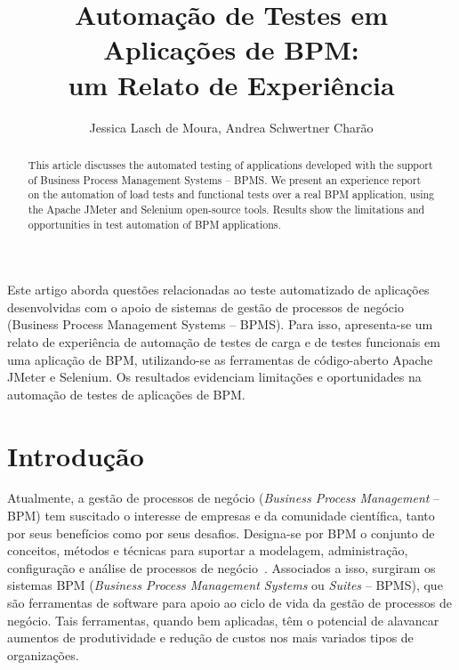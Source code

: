 \documentclass[12pt]{article}
\title{Automação de Testes em Aplicações de BPM:\\ um Relato de Experiência}
\author{Jessica Lasch de Moura\inst{1},
Andrea Schwertner Charão\inst{1}}
\begin{document}
\maketitle




\begin{resumo}
Este artigo aborda questões relacionadas ao teste automatizado de aplicações desenvolvidas com o apoio de sistemas de gestão de processos de negócio (Business Process Management Systems -- BPMS). Para isso, apresenta-se um relato de experiência de automação de testes de carga e de testes funcionais em uma aplicação de BPM, utilizando-se as ferramentas de código-aberto Apache JMeter e Selenium. Os resultados evidenciam limitações e oportunidades na automação de testes de aplicações de BPM.
\end{resumo}

\begin{abstract}
This article discusses the automated testing of applications developed with the support of Business Process Management Systems -- BPMS. We present an experience report on the automation of load tests and functional tests over a real BPM application, using the Apache JMeter and Selenium open-source tools. Results show the limitations and opportunities in test automation of BPM applications.
\end{abstract}




\section{Introdução}

Atualmente, a gestão de processos de negócio (\emph{Business Process Management} -- BPM) tem suscitado o interesse de empresas e da comunidade científica, tanto por seus benefícios como por seus desafios. Designa-se por BPM o conjunto de conceitos, métodos e técnicas para suportar a modelagem, administração, configuração e análise de processos de negócio~\cite{weske, aalst2013survey}. Associados a isso, surgiram os sistemas BPM (\emph{Business Process Management Systems} ou \emph{Suites} -- BPMS), que são ferramentas de software para apoio ao ciclo de vida da gestão de processos de negócio. Tais ferramentas, quando bem aplicadas, têm o potencial de alavancar aumentos de produtividade e redução de custos nos mais variados tipos de organizações. 
\end{document}
